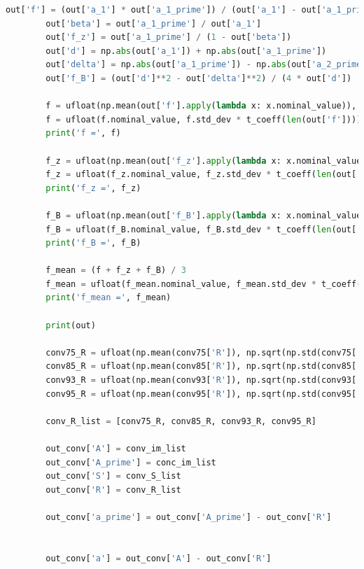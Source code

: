 \documentclass[a4paper,11pt]{article}
\begin{document}
\begin{lstlisting}[language=Python, basicstyle=\tiny, breaklines=true, postbreak=\mbox{\textbackslashspace}]
        out['f'] = (out['a_1'] * out['a_1_prime']) / (out['a_1'] - out['a_1_prime'])
        out['beta'] = out['a_1_prime'] / out['a_1']
        out['f_z'] = out['a_1_prime'] / (1 - out['beta'])
        out['d'] = np.abs(out['a_1']) + np.abs(out['a_1_prime'])
        out['delta'] = np.abs(out['a_1_prime']) - np.abs(out['a_2_prime'])
        out['f_B'] = (out['d']**2 - out['delta']**2) / (4 * out['d'])

        f = ufloat(np.mean(out['f'].apply(lambda x: x.nominal_value)), np.sqrt(np.std(out['f'].apply(lambda x: x.nominal_value))**2 + np.mean(out['f'].apply(lambda x: x.std_dev))**2))
        f = ufloat(f.nominal_value, f.std_dev * t_coeff(len(out['f'])))
        print('f =', f)

        f_z = ufloat(np.mean(out['f_z'].apply(lambda x: x.nominal_value)), np.sqrt(np.std(out['f_z'].apply(lambda x: x.nominal_value))**2 + np.mean(out['f_z'].apply(lambda x: x.std_dev))**2))
        f_z = ufloat(f_z.nominal_value, f_z.std_dev * t_coeff(len(out['f_z'])))
        print('f_z =', f_z)

        f_B = ufloat(np.mean(out['f_B'].apply(lambda x: x.nominal_value)), np.sqrt(np.std(out['f_B'].apply(lambda x: x.nominal_value))**2 + np.mean(out['f_B'].apply(lambda x: x.std_dev))**2))
        f_B = ufloat(f_B.nominal_value, f_B.std_dev * t_coeff(len(out['f_B'])))
        print('f_B =', f_B)

        f_mean = (f + f_z + f_B) / 3
        f_mean = ufloat(f_mean.nominal_value, f_mean.std_dev * t_coeff(3))
        print('f_mean =', f_mean)

        print(out)

        conv75_R = ufloat(np.mean(conv75['R']), np.sqrt(np.std(conv75['R'])**2 + 0.1**2)) - source
        conv85_R = ufloat(np.mean(conv85['R']), np.sqrt(np.std(conv85['R'])**2 + 0.1**2)) - source
        conv93_R = ufloat(np.mean(conv93['R']), np.sqrt(np.std(conv93['R'])**2 + 0.1**2)) - source
        conv95_R = ufloat(np.mean(conv95['R']), np.sqrt(np.std(conv95['R'])**2 + 0.1**2)) - source

        conv_R_list = [conv75_R, conv85_R, conv93_R, conv95_R]

        out_conv['A'] = conv_im_list
        out_conv['A_prime'] = conc_im_list
        out_conv['S'] = conv_S_list
        out_conv['R'] = conv_R_list

        out_conv['a_prime'] = out_conv['A_prime'] - out_conv['R']


        out_conv['a'] = out_conv['A'] - out_conv['R']


\end{lstlisting}
\end{document}
